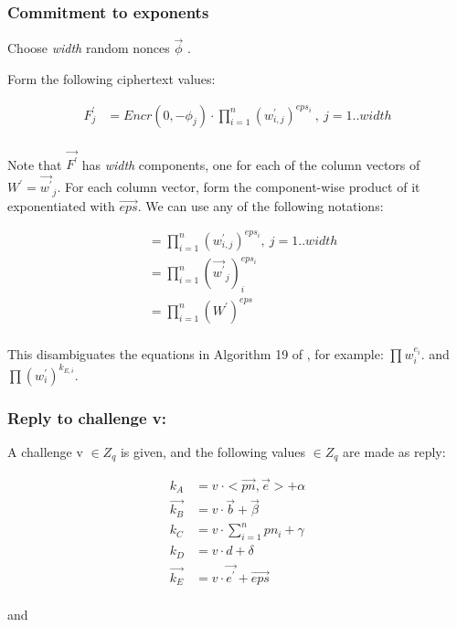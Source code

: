 \documentclass{article}
\begin{document}
\subsubsection*{Commitment to exponents}

Choose \emph{width} random nonces $\vec{\phi}$ .

Form the following ciphertext values:

\begin{align*}
F_{j}^{\prime} & =Encr(0,-{\phi_{j}})\cdot\prod_{i=1}^{n}(w_{i,j}^{\prime})^{eps_{i}}\ ,\ j=1..width\\
\end{align*}

Note that $\vec{F^{\prime}}$ has \emph{width} components, one for
each of the column vectors of $W^{\prime}=\vec{w^{\prime}}_{j}$.
For each column vector, form the component-wise product of it exponentiated
with $\vec{eps}$. We can use any of the following notations:

\begin{align*}
 & =\prod_{i=1}^{n}(w_{i,j}^{\prime})^{eps_{i}},\ j=1..width\\
 & =\prod_{i=1}^{n}(\vec{w^{\prime}}_{j})_{i}^{eps_{i}}\\
 & =\prod_{i=1}^{n}(W^{\prime})^{eps}\\
\end{align*}

This disambiguates the equations in Algorithm 19 of \cite{Wikstr22}, for example:
$\prod w_{i}^{e_{i}}$. and $\prod(w_{i}^{\prime})^{k_{E,i}}$.

\subsubsection*{Reply to challenge v:}

A challenge v $\in Z_{q}$ is given, and the following values $\in Z_{q}$
are made as reply:

\begin{align*}
k_{A} & =v\ \cdot<\vec{pn},\vec{e}>+\alpha\\
\vec{k_{B}} & =v\cdot\vec{b}+\vec{\beta}\\
k_{C} & =v\cdot\sum_{i=1}^{n}pn_{i}+\gamma\\
k_{D} & =v\cdot d+\delta\\
\vec{k_{E}} & =v\cdot\vec{e^{\prime}}+\vec{eps}\\
\end{align*}

and
\end{document}
